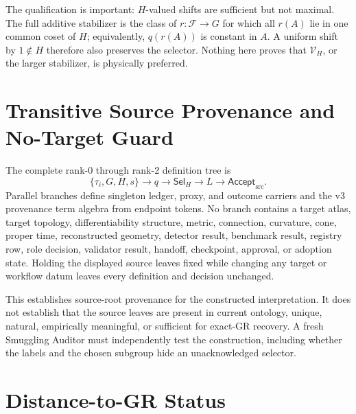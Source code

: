 \documentclass[11pt]{article}
\newcommand{\Accept}{\mathsf{Accept}_{\mathrm{src}}}
\newcommand{\Sel}{\mathsf{Sel}_{H}}
\newcommand{\Vary}{\mathcal V_H}
\begin{document}
The qualification is important: \(H\)-valued shifts are sufficient but not
maximal. The full additive stabilizer is the class of \(r:\mathcal F\to G\)
for which all \(r(A)\) lie in one common coset of \(H\); equivalently,
\(q(r(A))\) is constant in \(A\). A uniform shift by \(1\notin H\) therefore
also preserves the selector. Nothing here proves that \(\Vary\), or the
larger stabilizer, is physically preferred.

\section{Transitive Source Provenance and No-Target Guard}

The complete rank-0 through rank-2 definition tree is
\[
\{\tau_i,G,H,s\}
\longrightarrow q
\longrightarrow \Sel
\longrightarrow L
\longrightarrow \Accept.
\]
Parallel branches define singleton ledger, proxy, and outcome carriers and the
v3 provenance term algebra from endpoint tokens. No branch contains a target
atlas, target topology, differentiability structure, metric, connection,
curvature, cone, proper time, reconstructed geometry, detector result,
benchmark result, registry row, role decision, validator result, handoff,
checkpoint, approval, or adoption state. Holding the displayed source leaves
fixed while changing any target or workflow datum leaves every definition and
decision unchanged.

This establishes source-root provenance for the constructed interpretation.
It does not establish that the source leaves are present in current ontology,
unique, natural, empirically meaningful, or sufficient for exact-GR recovery.
A fresh Smuggling Auditor must independently test the construction, including
whether the labels and the chosen subgroup hide an unacknowledged selector.

\section{Distance-to-GR Status}
\end{document}
